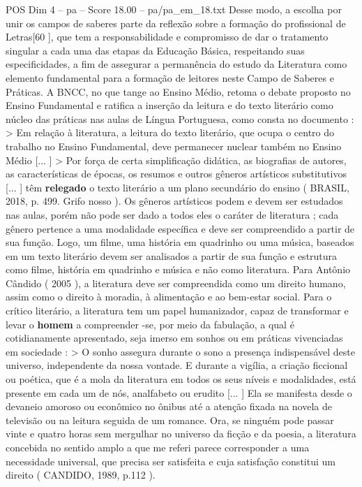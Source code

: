 \begin{textsample}{POS Dim 4 – pa – Score 18.00 – pa/pa\_em\_18.txt}
Desse modo, a escolha por unir os campos de saberes parte da reflexão sobre a formação do profissional de Letras[60 ], que tem a responsabilidade e compromisso de dar o tratamento singular a cada uma das etapas da Educação Básica, respeitando suas especificidades, a fim de assegurar a permanência do estudo da Literatura como elemento fundamental para a formação de leitores neste Campo de Saberes e Práticas.
A BNCC, no que tange ao Ensino Médio, retoma o debate proposto no Ensino Fundamental e ratifica a inserção da leitura e do texto literário como núcleo das práticas nas aulas de Língua Portuguesa, como consta no documento : > Em relação à literatura, a leitura do texto literário, que ocupa o centro do trabalho no Ensino Fundamental, deve permanecer nuclear também no Ensino Médio [... ] > Por força de certa simplificação didática, as biografias de autores, as características de épocas, os resumos e outros gêneros artísticos substitutivos [... ] têm \textbf{relegado} o texto literário a um plano secundário do ensino ( BRASIL, 2018, p. 499.
Grifo nosso ).
Os gêneros artísticos podem e devem ser estudados nas aulas, porém não pode ser dado a todos eles o caráter de literatura ; cada gênero pertence a uma modalidade específica e deve ser compreendido a partir de sua função.
Logo, um filme, uma história em quadrinho ou uma música, baseados em um texto literário devem ser analisados a partir de sua função e estrutura como filme, história em quadrinho e música e não como literatura.
Para Antônio Cândido ( 2005 ), a literatura deve ser compreendida como um direito humano, assim como o direito à moradia, à alimentação e ao bem-estar social.
Para o crítico literário, a literatura tem um papel humanizador, capaz de transformar e levar o \textbf{homem} a compreender -se, por meio da fabulação, a qual é cotidianamente apresentado, seja imerso em sonhos ou em práticas vivenciadas em sociedade : > O sonho assegura durante o sono a presença indispensável deste universo, independente da nossa vontade.
E durante a vigília, a criação ficcional ou poética, que é a mola da literatura em todos os seus níveis e modalidades, está presente em cada um de nós, analfabeto ou erudito [... ] Ela se manifesta desde o devaneio amoroso ou econômico no ônibus até a atenção fixada na novela de televisão ou na leitura seguida de um romance.
Ora, se ninguém pode passar vinte e quatro horas sem mergulhar no universo da ficção e da poesia, a literatura concebida no sentido amplo a que me referi parece corresponder a uma necessidade universal, que precisa ser satisfeita e cuja satisfação constitui um direito ( CANDIDO, 1989, p.112 ).

\end{textsample}
